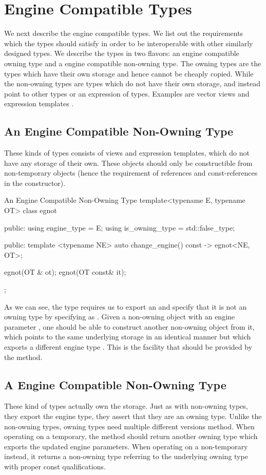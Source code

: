 \documentclass[oneside,11pt,a4paper]{jbarticle}
\begin{document}
\section{Engine Compatible Types}

We next describe the engine compatible types. We list out the requirements which
the types should satisfy in order to be interoperable with other similarly
designed types. We describe the types in two flavors: an engine compatible
owning type and a engine compatible non-owning type. The owning types are the
types which have their own storage and hence cannot be cheaply copied. While the
non-owning types are types which do not have their own storage, and instead
point to other types or an expression of types. Examples are vector views
and expression templates .

\subsection{An Engine Compatible Non-Owning Type}

These kinds of types  consists of views and expression templates, which do not
have any storage of their own. These objects should only be constructible from
non-temporary objects (hence the requirement of references and const-references
in the constructor).

\begin{codecpp}{An Engine Compatible Non-Owning Type}
  template<typename E, typename OT>
  class egnot {
  public:
    using engine_type = E;
    using is_owning_type = std::false_type;

  public:
    template <typename NE>
    auto change_engine() const -> egnot<NE, OT>;

    egnot(OT & ot);
    egnot(OT const& it);
  };
\end{codecpp}

As we can see, the type requires us to export an  and
specify that it is not an owning type by specifying 
as . Given a non-owning object with an engine
parameter , one should be able to construct another non-owning
object from it, which points to the same underlying storage in an identical
manner but which exports a different engine type . This is the
facility that should be provided by the  method.

\subsection{A Engine Compatible Non-Owning Type}
These kind of types actually own the storage. Just as with non-owning types,
they export the engine type, they assert that they are an owning type. Unlike
the non-owning types, owning types need multiple different versions
 method. When operating on a temporary, the method
should return another owning type which exports the updated engine parameters.
When operating on a non-temporary instead, it returns a non-owning type
referring to the underlying owning type with proper const qualifications.
\end{document}
